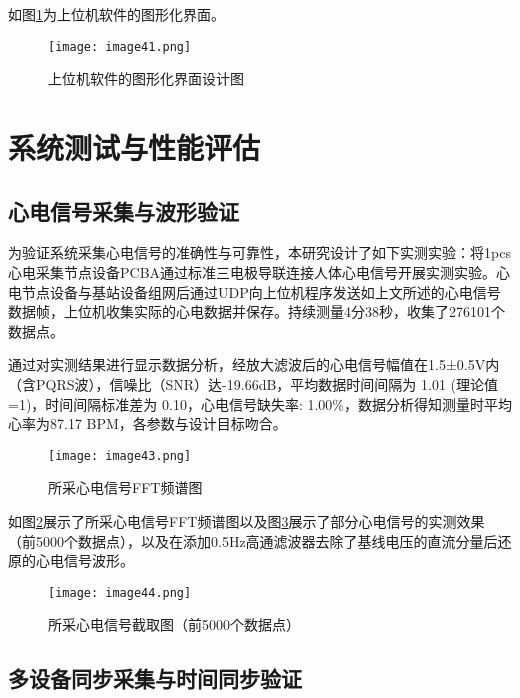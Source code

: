 如图\ref{F.ECG_image41}为上位机软件的图形化界面。

\begin{figure}[H]
    \centering
    \texttt{[image: image41.png]}
    \caption{上位机软件的图形化界面设计图}
    \label{F.ECG_image41}
\end{figure}



\section{系统测试与性能评估}

\subsection{心电信号采集与波形验证}

为验证系统采集心电信号的准确性与可靠性，本研究设计了如下实测实验：将1pcs心电采集节点设备PCBA通过标准三电极导联连接人体心电信号开展实测实验。心电节点设备与基站设备组网后通过UDP向上位机程序发送如上文所述的心电信号数据帧，上位机收集实际的心电数据并保存。持续测量4分38秒，收集了276101个数据点。

通过对实测结果进行显示数据分析，经放大滤波后的心电信号幅值在1.5±0.5V内（含PQRS波），信噪比（SNR）达-19.66dB，平均数据时间间隔为 1.01 (理论值=1)，时间间隔标准差为 0.10，心电信号缺失率: 1.00\%，数据分析得知测量时平均心率为87.17 BPM，各参数与设计目标吻合。

\begin{figure}[htb]
    \centering
    \texttt{[image: image43.png]}
    \caption{所采心电信号FFT频谱图}
    \label{F.ECG_image43}
\end{figure}

如图\ref{F.ECG_image43}展示了所采心电信号FFT频谱图以及图\ref{F.ECG_image44}展示了部分心电信号的实测效果（前5000个数据点），以及在添加0.5Hz高通滤波器去除了基线电压的直流分量后还原的心电信号波形。

\begin{figure}[H]
    \centering
    \texttt{[image: image44.png]}
    \caption{所采心电信号截取图（前5000个数据点）}
    \label{F.ECG_image44}
\end{figure}

\newpage

\subsection{多设备同步采集与时间同步验证}

